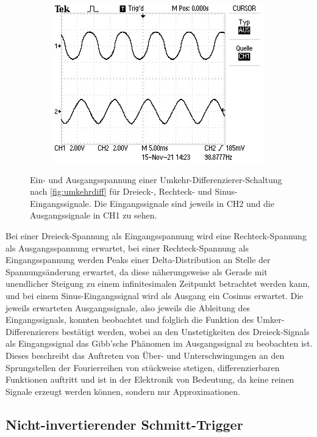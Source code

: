\begin{figure}[H]
\begin{subfigure}{.496\textwidth}
    \includegraphics[width=\linewidth]{data/ALL0064/F0064TEK.JPG}
  \end{subfigure}
  \caption{Ein- und Ausgangsspannung einer Umkehr-Differenzierer-Schaltung nach \autoref{fig:umkehrdiff} für Dreieck-, Rechteck- und Sinus-Eingangssignale. Die Eingangssignale sind jeweils in CH2 und die Ausgangssignale in CH1 zu sehen.}
  \label{fig:diff_oszi}
\end{figure}


Bei einer Dreieck-Spannung als Eingangsspannung wird eine Rechteck-Spannung als Ausgangsspannung erwartet, bei einer Rechteck-Spannung als Eingangsspannung werden Peaks einer Delta-Distribution an Stelle der Spannungsänderung erwartet, da diese näherungsweise als Gerade mit unendlicher Steigung zu einem infinitesimalen Zeitpunkt betrachtet werden kann, und bei einem Sinus-Eingangssignal wird als Ausgang ein Cosinus erwartet. Die jeweils erwarteten Ausgangssignale, also jeweils die Ableitung des Eingangssignals, konnten beobachtet und folglich die Funktion des Umker-Differenzierers bestätigt werden, wobei an den Unstetigkeiten des Dreieck-Signals als Eingangssignal das Gibb'sche Phänomen im Ausgangssignal zu beobachten ist. Dieses beschreibt das Auftreten von Über- und Unterschwingungen an den Sprungstellen der Fourierreihen von stückweise stetigen, differenzierbaren Funktionen auftritt und ist in der Elektronik von Bedeutung, da keine reinen Signale erzeugt werden können, sondern nur Approximationen.

\subsection{Nicht-invertierender Schmitt-Trigger}

